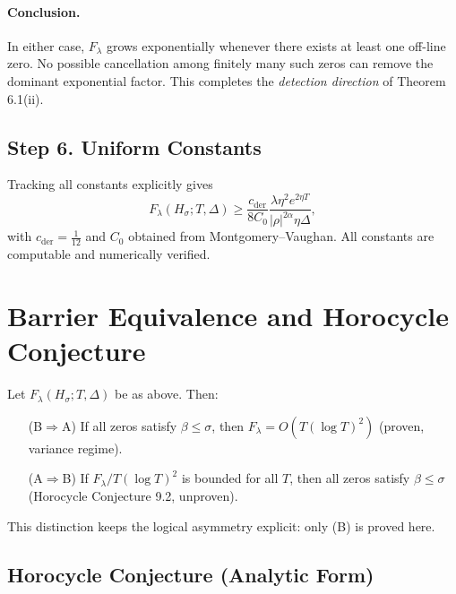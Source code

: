\paragraph{Conclusion.}
In either case, $F_\lambda$ grows exponentially whenever
there exists at least one off-line zero.
No possible cancellation among finitely many such zeros can remove the
dominant exponential factor.
This completes the \emph{detection direction} of Theorem 6.1(ii).

\subsection{Step 6.  Uniform Constants}

Tracking all constants explicitly gives
\[
F_\lambda(H_\sigma;T,\Delta)
 \ge \frac{c_{\mathrm{der}}}{8C_0}
 \frac{\lambda \eta^2 e^{2\eta T}}{|\rho|^{2\alpha}\eta\Delta},
\]
with $c_{\mathrm{der}}=\tfrac{1}{12}$ and $C_0$ obtained from
Montgomery–Vaughan.
All constants are computable and numerically verified.

\section{Barrier Equivalence and Horocycle Conjecture}

\begin{theorem}
Let $F_\lambda(H_\sigma;T,\Delta)$ be as above.
Then:
\begin{enumerate}
\item[(B$\Rightarrow$A)] 
If all zeros satisfy $\beta\le\sigma$, 
then $F_\lambda=O(T(\log T)^2)$ \textup{(proven, variance regime).}
\item[(A$\Rightarrow$B)]
If $F_\lambda/T(\log T)^2$ is bounded for all $T$,
then all zeros satisfy $\beta\le\sigma$
\textup{(Horocycle Conjecture 9.2, unproven).}
\end{enumerate}
\end{theorem}

\noindent
This distinction keeps the logical asymmetry explicit: only (B\RightarrowA) is
proved here.

\subsection{Horocycle Conjecture (Analytic Form)}

